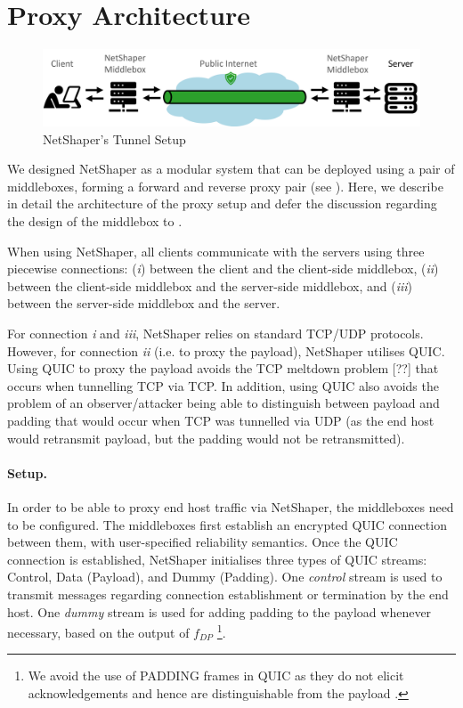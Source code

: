 \section{Proxy Architecture}
\label{sec:netshaper-proxy-arch}

\begin{figure}[!htb]
    \centering
    \includegraphics[width=\columnwidth]{figures/netshaper/netshaper-setup.png}
    \caption{NetShaper's Tunnel Setup}
    \label{fig:netshaper-setup}
\end{figure}

We designed NetShaper as a modular system that can be deployed using a pair of middleboxes, forming a forward and reverse proxy pair (see ). 
Here, we describe in detail the architecture of the proxy setup and defer the discussion regarding the design of the middlebox to . 

When using NetShaper, all clients communicate with the servers using three piecewise connections: 
(\textit{i}) between the client and the client-side middlebox, 
(\textit{ii}) between the client-side middlebox and the server-side middlebox, and
(\textit{iii}) between the server-side middlebox and the server.

For connection \textit{i} and \textit{iii}, NetShaper relies on standard TCP/UDP protocols. However, for connection \textit{ii} (i.e. to proxy the payload), NetShaper utilises QUIC. 
Using QUIC to proxy the payload avoids the TCP meltdown problem [??] that occurs when tunnelling TCP via TCP.
In addition, using QUIC also avoids the problem of an observer/attacker being able to distinguish between payload and padding that would occur when TCP was tunnelled via UDP (as the end host would retransmit payload, but the padding would not be retransmitted).

\paragraph{Setup.}
In order to be able to proxy end host traffic via NetShaper, the middleboxes need to be configured. 
The middleboxes first establish an encrypted QUIC connection between them, with user-specified reliability semantics.
Once the QUIC connection is established, NetShaper initialises three types of QUIC streams: Control, Data (Payload), and Dummy (Padding).
One \textit{control} stream is used to transmit messages regarding connection establishment or termination by the end host.
One \textit{dummy} stream is used for adding padding to the payload whenever necessary, based on the output of $f_{DP}$
\footnote{We avoid the use of PADDING frames in QUIC as they do not elicit acknowledgements and hence are distinguishable from the payload \cite{quic_rfc}.}.

